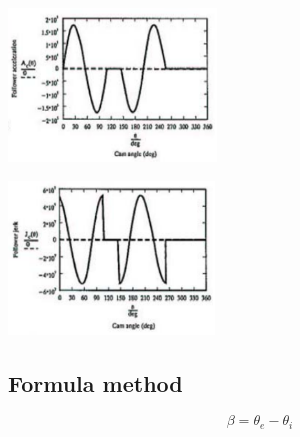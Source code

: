 \documentclass[11pt]{article}
\begin{document}
\begin{center}
\includegraphics[height=11em]{./images/cycloidal-motion-acceleration-graph.png}
\end{center}

\begin{center}
\includegraphics[height=11em]{./images/cycloidal-motion-jerk-graph.png}
\end{center}
\subsection{Formula method}
\label{sec:org7fef7d9}
\[\beta = \theta_e - \theta_i\]
\end{document}
